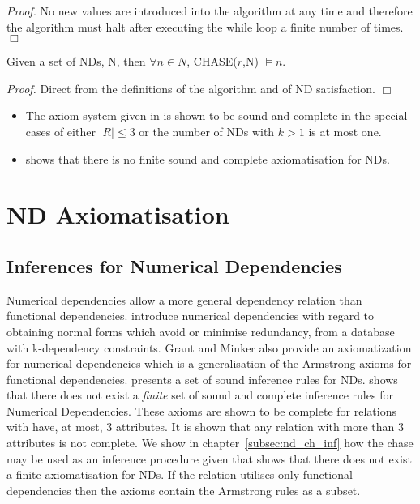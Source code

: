 {\em Proof.} No new values are introduced into the algorithm at any
time and therefore the algorithm must halt after executing the while
loop a finite number of times. $\Box$

\begin{theorem}\label{th:chase}
\begin{rm}
Given a set of NDs, N, then $\forall n \in N$, CHASE($r$,N) $\models n$.
\end{rm}
\end{theorem}

{\em Proof.} Direct from the definitions of the algorithm and of ND
satisfaction. $\Box$


\begin{itemize}
\item The axiom system given in \cite{gm85a} is shown to be sound and
complete in the special cases of either $|R| \le 3$ or the number of
NDs with $k > 1$ is at most one.
\item \cite{gm85b} shows that there is no finite sound and complete
axiomatisation for NDs. 
\end{itemize}






\section{ND Axiomatisation}\label{sec:nd_axiom}


\subsection{Inferences for Numerical Dependencies}

Numerical dependencies allow a more general dependency relation than functional
dependencies.  \cite{gm85a,gm85b} introduce numerical dependencies with regard
to obtaining normal forms which avoid or minimise redundancy, from a database with k-dependency constraints. Grant and Minker also provide an axiomatization for numerical dependencies which is a generalisation of the Armstrong axioms for
functional dependencies. \cite{gm85a} presents a set of sound inference rules for NDs. \cite{gm85b}
shows that there does not exist a {\em finite} set of sound and
complete inference rules for Numerical Dependencies.
These axioms are shown to be complete for relations with have, at most,
3 attributes.  It is shown that any relation with more than 3 attributes is
not complete. We show in chapter~\ref{subsec:nd_ch_inf} how the chase may
be used as an inference procedure given that \cite{gm85a} shows that
there does not exist a finite axiomatisation for NDs.
If the relation utilises only functional dependencies then the axioms
contain the Armstrong rules as a subset.\\

